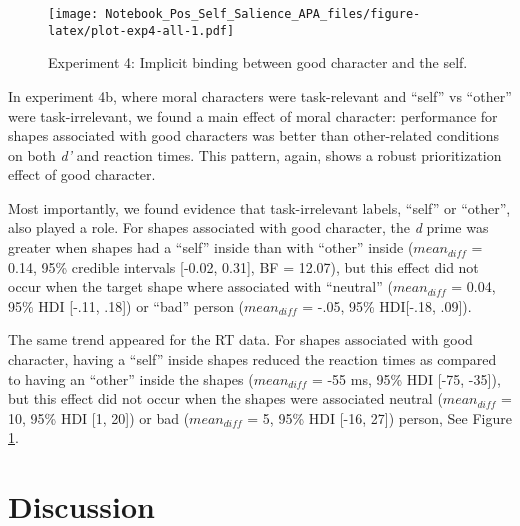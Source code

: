 \documentclass[
  man]{apa6}
\begin{document}
\begin{figure}
\centering
\texttt{[image: Notebook\_Pos\_Self\_Salience\_APA\_files/figure-latex/plot-exp4-all-1.pdf]}
\caption{\label{fig:plot-exp4-all}Experiment 4: Implicit binding between good character and the self.}
\end{figure}

In experiment 4b, where moral characters were task-relevant and ``self'' vs ``other'' were task-irrelevant, we found a main effect of moral character: performance for shapes associated with good characters was better than other-related conditions on both \emph{d'} and reaction times. This pattern, again, shows a robust prioritization effect of good character.

Most importantly, we found evidence that task-irrelevant labels, ``self'' or ``other'', also played a role. For shapes associated with good character, the \emph{d} prime was greater when shapes had a ``self'' inside than with ``other'' inside (\(mean_{diff}\) = 0.14, 95\% credible intervals {[}-0.02, 0.31{]}, BF = 12.07), but this effect did not occur when the target shape where associated with ``neutral'' (\(mean_{diff}\) = 0.04, 95\% HDI {[}-.11, .18{]}) or ``bad'' person (\(mean_{diff}\) = -.05, 95\% HDI{[}-.18, .09{]}).

The same trend appeared for the RT data. For shapes associated with good character, having a ``self'' inside shapes reduced the reaction times as compared to having an ``other'' inside the shapes (\(mean_{diff}\) = -55 ms, 95\% HDI {[}-75, -35{]}), but this effect did not occur when the shapes were associated neutral (\(mean_{diff}\) = 10, 95\% HDI {[}1, 20{]}) or bad (\(mean_{diff}\) = 5, 95\% HDI {[}-16, 27{]}) person, See Figure \ref{fig:plot-exp4-all}.

\hypertarget{discussion}{%
\section{Discussion}\label{discussion}}
\end{document}
